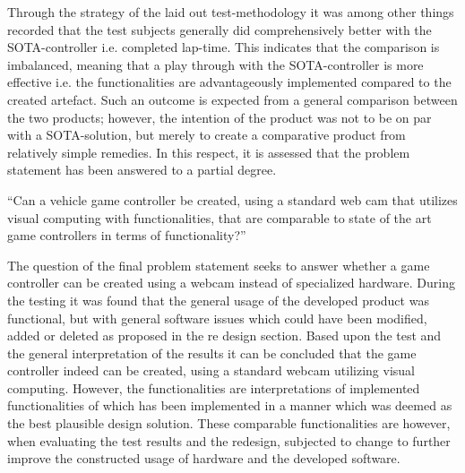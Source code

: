 Through the strategy of the laid out test-methodology it was among other things recorded that the test subjects generally did comprehensively better with the SOTA-controller i.e. completed lap-time. This indicates that the comparison is imbalanced, meaning that a play through with the SOTA-controller is more effective i.e. the functionalities are advantageously implemented compared to the created artefact.
Such an outcome is expected from a general comparison between the two products; however, the intention of the product was not to be on par with a SOTA-solution, but merely to create a comparative product from relatively simple remedies. In this respect, it is assessed that the problem statement has been answered to a partial degree.
\bigskip

“Can a vehicle game controller be created, using a standard web cam that utilizes visual computing with functionalities, that are comparable to state of the art game controllers in terms of functionality?”
\bigskip

The question of the final problem statement seeks to answer whether a game controller can be created using a webcam instead of specialized hardware. During the testing it was found that the general usage of the developed product was functional, but with general software issues which could have been modified, added or deleted as proposed in the re design section. 
Based upon the test and the general interpretation of the results it can be concluded that the game controller indeed can be created, using a standard webcam utilizing visual computing. However, the functionalities are interpretations of implemented functionalities of which has been implemented in a manner which was deemed as the best plausible design solution. These comparable functionalities are however, when evaluating the test results and the redesign, subjected to change to further improve the constructed usage of hardware and the developed software.
